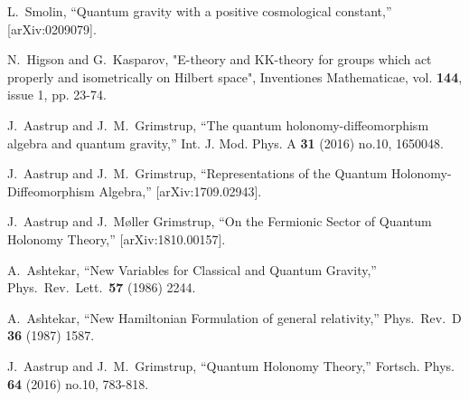 \documentclass[letterpaper,11pt]{article}
\begin{document}
\begin{thebibliography}{99}
  L.~Smolin,
  ``Quantum gravity with a positive cosmological constant,''
  [arXiv:0209079].


  
N.~Higson and G.~Kasparov, "E-theory and KK-theory for groups which act properly and isometrically on Hilbert space", 
Inventiones Mathematicae, vol. {\bf 144}, issue 1, pp. 23-74.





J.~Aastrup and J.~M.~Grimstrup,
``The quantum holonomy-diffeomorphism algebra and quantum gravity,''
Int. J. Mod. Phys. A \textbf{31} (2016) no.10, 1650048.








  J.~Aastrup and J.~M.~Grimstrup,
  ``Representations of the Quantum Holonomy-Diffeomorphism Algebra,''
  [arXiv:1709.02943].

J.~Aastrup and J.~M\o{}ller Grimstrup,
``On the Fermionic Sector of Quantum Holonomy Theory,''
[arXiv:1810.00157].




  A.~Ashtekar,
  ``New Variables for Classical and Quantum Gravity,''
  Phys.\ Rev.\ Lett.\  {\bf 57} (1986) 2244.

  A.~Ashtekar,
  ``New Hamiltonian Formulation of general relativity,''
  Phys.\ Rev.\  D {\bf 36} (1987) 1587.




J.~Aastrup and J.~M.~Grimstrup,
``Quantum Holonomy Theory,''
Fortsch. Phys. \textbf{64} (2016) no.10, 783-818.









\end{thebibliography}
\end{document}
